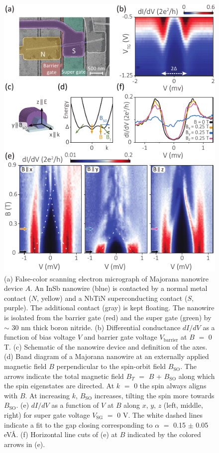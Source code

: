 \begin{figure}
\begin{center}
\includegraphics[width=0.7\columnwidth]{chapter_spinorbit/figures/Fig1.pdf}
\caption{\label{fig:fig1}
(a) False-color scanning electron micrograph of Majorana nanowire device $A$.
An InSb nanowire (blue) is contacted by a normal metal contact ($N$, yellow) and a NbTiN superconducting contact ($S$, purple).
The additional contact (gray) is kept floating.
The nanowire is isolated from the barrier gate (red) and the super gate (green) by $\sim$ 30 nm thick boron nitride.
(b) Differential conductance $dI/dV$ as a function of bias voltage $V$ and barrier gate voltage $V_{\mathrm{barrier}}$ at $B$ $=$ 0 T.
(c) Schematic of the nanowire device and definition of the axes.
(d) Band diagram of a Majorana nanowire at an externally applied magnetic field $B$ perpendicular to the spin-orbit field $B_{\mathrm{SO}}$.
The arrows indicate the total magnetic field $B_T$ $=$ $B$ + $B_{\mathrm{SO}}$ along which the spin eigenstates are directed.
At $k$ $=$ 0 the spin always aligns with $B$.
At increasing $k$, $B_{\mathrm{SO}}$ increases, tilting the spin more towards $B_{\mathrm{SO}}$.
(e) $dI/dV$ as a function of $V$ at $B$ along $x$, $y$, $z$ (left, middle, right) for super gate voltage $V_{\mathrm{SG}}$ $=$ 0 V.
The white dashed lines indicate a fit to the gap closing corresponding to $\alpha$ $=$ 0.15 $\pm$ 0.05 eV\AA.
(f) Horizontal line cuts of (e) at $B$ indicated by the colored arrows in (e).
}
\end{center}
\end{figure}

